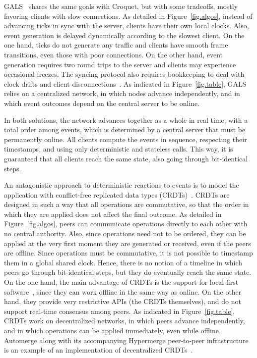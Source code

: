 \documentclass[10pt,journal,compsoc]{IEEEtran}
\begin{document}
GALS~\cite{gals} shares the same goals with Croquet, but with some tradeoffs,
mostly favoring clients with slow connections.
As detailed in Figure~\ref{fig.algos}, instead of advancing ticks in sync with
the server, clients have their own local clocks.
Also, event generation is delayed dynamically according to the slowest client.
%
On the one hand, ticks do not generate any traffic and clients have smooth
frame transitions, even those with poor connections.
On the other hand, event generation requires two round trips to the server and
clients may experience occasional freezes.
The syncing protocol also requires bookkeeping to deal with clock drifts and
client disconnections~\cite{gals}.
%
As indicated in Figure~\ref{fig.table}, GALS relies on a centralized
network, in which nodes advance independently, and in which event outcomes
depend on the central server to be online.

In both solutions, the network advances together as a whole in real time, with
a total order among events, which is determined by a central server that must
be permanently online.
All clients compute the events in sequence, respecting their timestamps, and
using only deterministic and stateless calls.
This way, it is guaranteed that all clients reach the same state, also going
through bit-identical steps.

An antagonistic approach to deterministic reactions to events is to model the
application with conflict-free replicated data types (CRDTs)~\cite{crdts}.
CRDTs are designed in such a way that all operations are commutative, so that
the order in which they are applied does not affect the final outcome.
%
As detailed in Figure~\ref{fig.algos}, peers can communicate operations
directly to each other with no central authority.
Also, since operations need not to be ordered, they can be applied at the
very first moment they are generated or received, even if the peers are
offline.
%
Since operations must be commutative, it is not possible to timestamp them
in a global shared clock.
Hence, there is no notion of a timeline in which peers go through
bit-identical steps, but they do eventually reach the same state.
%
On the one hand, the main advantage of CRDTs is the support for local-first
software~\cite{local}, since they can work offline in the same way as online.
On the other hand, they provide very restrictive APIs (the CRDTs themselves),
and do not support real-time consensus among peers.
%
As indicated in Figure~\ref{fig.table}, CRDTs work on decentralized networks,
in which peers advance independently, and in which operations can be applied
immediately, even while offline.
%
Automerge along with its accompanying Hypermerge peer-to-peer infrastructure
is an example of an implementation of decentralized
CRDTs~\cite{p2p.automerge,p2p.pushpin}.
\end{document}
